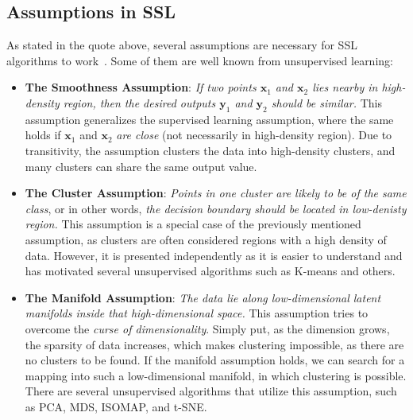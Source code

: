 \subsection{Assumptions in SSL}
As stated in the quote above, several assumptions are necessary for SSL algorithms to work~\cite[p. 5]{ssl-book-2006}. 
Some of them are well known from unsupervised learning:
\begin{itemize}
    \item \textbf{The Smoothness Assumption}: \textit{If two points $\mathbf{x}_1$ and $\mathbf{x}_2$ lies nearby in high-density region, 
    then the desired outputs $\mathbf{y}_1$ and $\mathbf{y}_2$ should be similar.} This assumption generalizes the supervised learning assumption,
    where the same holds if $\mathbf{x}_1$ and $\mathbf{x}_2$ \textit{are close} (not necessarily in high-density region). Due to transitivity, 
    the assumption clusters the data into high-density clusters, and many clusters can share the same output value.
    \item \textbf{The Cluster Assumption}: \textit{Points in one cluster are likely to be of the same class}, or in other words, \textit{the decision 
    boundary should be located in low-denisty region.} This assumption is a special case of the previously mentioned assumption, as clusters are often 
    considered regions with a high density of data. However, it is presented independently as it is easier to understand and has motivated several 
    unsupervised algorithms such as K-means and others. %
    \item \textbf{The Manifold Assumption}: \textit{The data lie along low-dimensional latent manifolds inside that high-dimensional space.} This
    assumption tries to overcome the \textit{curse of dimensionality}. Simply put, as the dimension grows, the sparsity of data increases, which makes 
    clustering impossible, as there are no clusters to be found. If the manifold assumption holds, we can search for a mapping into such a 
    low-dimensional manifold, in which clustering is possible. There are several unsupervised algorithms that utilize this assumption, such as PCA, 
    MDS, ISOMAP, and t-SNE.
\end{itemize}



